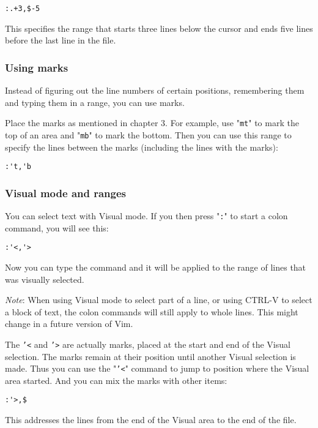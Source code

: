 \begin{Verbatim}[samepage=true]
 :.+3,$-5
\end{Verbatim}

This specifies the range that starts three lines below the cursor and ends five lines before the last line in the file.
\subsubsection{Using marks}
Instead of figuring out the line numbers of certain positions, remembering them and typing them in a range, you can use marks.

Place the marks as mentioned in chapter 3.
For example, use "\texttt{mt}" to mark the top of an area and "\texttt{mb}" to mark the bottom.
Then you can use this range to specify the lines between the marks (including the lines with the marks):

\begin{Verbatim}[samepage=true]
 :'t,'b
\end{Verbatim}
\subsubsection{Visual mode and ranges}
You can select text with Visual mode.
If you then press "\texttt{:}" to start a colon command, you will see this:

\begin{Verbatim}[samepage=true]
 :'<,'>
\end{Verbatim}

Now you can type the command and it will be applied to the range of lines that was visually selected.

\emph{Note}:
When using Visual mode to select part of a line, or using CTRL-V to select a block of text, the colon commands will still apply to whole lines.
This might change in a future version of Vim.

The \texttt{'<} and \texttt{'>} are actually marks, placed at the start and end of the Visual selection.
The marks remain at their position until another Visual selection is made.
Thus you can use the "\texttt{'<}" command to jump to position where the Visual area started.
And you can mix the marks with other items:

\begin{Verbatim}[samepage=true]
 :'>,$
\end{Verbatim}

This addresses the lines from the end of the Visual area to the end of the file.
